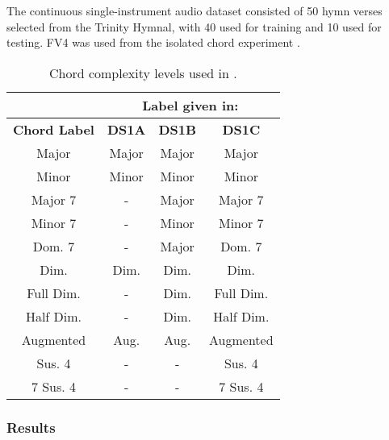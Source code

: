 \documentclass{sig-alternate}
\begin{document}

The continuous single-instrument audio dataset consisted of 50 hymn verses selected from the Trinity Hymnal, with 40 used for training and 10 used for testing. FV4 was used from the isolated chord experiment \cite{Morman:2006}.



\begin{table}
\centering
\begin{tabular}{|c|c|c|c|} \hline
&\multicolumn{3}{|c|}{\textbf{Label given in:}} \\ \hline
\textbf{Chord Label} & \textbf{DS1A} & \textbf{DS1B} & \textbf{DS1C} \\ \hline
Major & Major & Major & Major \\ \hline
Minor & Minor & Minor & Minor \\ \hline
Major 7 & - & Major & Major 7 \\ \hline
Minor 7 & - & Minor & Minor 7 \\ \hline
Dom. 7 & - & Major & Dom. 7 \\ \hline
Dim. & Dim. & Dim. & Dim. \\ \hline
Full Dim. & - & Dim. & Full Dim. \\ \hline
Half Dim. & - & Dim. & Half Dim. \\ \hline
Augmented & Aug. & Aug. & Augmented \\ \hline
Sus. 4 & - & - & Sus. 4 \\ \hline
7 Sus. 4 & - & - & 7 Sus. 4 \\ \hline
\end{tabular}
\caption{Chord complexity levels used in \cite{Morman:2006}.}
\label{tab:tab1}
\end{table} 



\subsubsection{Results}
\end{document}
